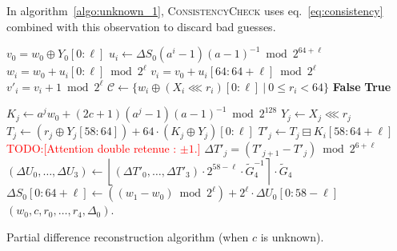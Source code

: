 \documentclass[preprint,svgnames]{iacrtrans}
\newcommand{\todo}[1]{\textcolor{red}{TODO:[#1]}}
\begin{document}
In algorithm~\ref{algo:unknown_1}, \textsc{ConsistencyCheck} uses
eq.~\eqref{eq:consistency} combined with this observation to discard bad guesses.



\begin{algorithm}
\begin{algorithmic}[1]
  \State $v_0 = w_0 \oplus Y_0[0:\ell]$ 
  \State $u_i \gets \Delta S_0 (a^i-1)(a-1)^{-1} \bmod 2^{64+\ell}$ 
  \State $w_i = w_0 + u_i[0:\ell] \bmod 2^{\ell}$ 
  \State $v_i = v_0 + u_i[64:64+\ell] \bmod 2^{\ell}$ 
  \State $v'_i = v_i + 1 \bmod 2^{\ell}$
  \State $\mathcal{C} \gets \{ w_i \oplus (X_i \lll r_i)[0:\ell]~|~ 0\leq r_i < 64\}$ 
  \State \Return \textbf{False} 
  \EndIf
  \EndFor
  \State \Return \textbf{True} 
  \EndProcedure

\State 
  
   
  \State $K_j \gets a^j w_0 + (2c+1)(a^j - 1)(a-1)^{-1} \bmod 2^{128}$ 
   
  \State $Y_j \gets X_j \lll r_j$ 
  \State $T_j \gets \left(r_j \oplus Y_j[58:64]\right) +  64 \cdot \left(K_j \oplus Y_j\right)[0:\ell]$ 
  \State $T'_j \gets T_j \boxminus  K_i[58:64+\ell]$ 
  \State \todo{Attention double retenue : $\pm 1$.}
  \State $\Delta T'_j = (T'_{j+1} - T'_j) \bmod 2^{6 + \ell}$  
  \State $(\Delta U_0, \dots, \Delta U_3) \gets \left\lfloor (\Delta T'_0, \dots, \Delta T'_3) \cdot 2^{58-\ell} \cdot \widetilde G_4^{-1} \right\rceil \cdot \widetilde G_4$ 
  \State $\Delta S_0[0:64+\ell] \gets \left((w_1 - w_0) \bmod 2^{\ell}\right) + 2^{\ell} \cdot \Delta U_0[0:58-\ell]$ 
  \State \Return $(w_0, c, r_0, \dots, r_4, \Delta_0)$.
  \EndIf
  \EndFor
  \EndFor
  \EndProcedure
\end{algorithmic}
\caption{Partial difference reconstruction algorithm (when $c$ is unknown).}
\label{algo:unknown_1}
\end{algorithm}
\end{document}
